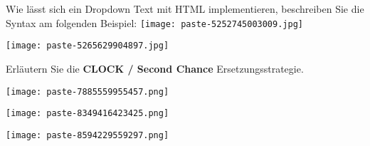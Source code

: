 \documentclass{article}
\begin{document}
\begin{tcolorbox}[colback=white!10!white,colframe=lightgray!75!black,
  savelowerto=\jobname_ex.tex,breakable,enhanced,lines before break=40]

\begin{center}
 Wie lässt sich ein Dropdown Text mit HTML implementieren, beschreiben Sie die Syntax am folgenden Beispiel:
\texttt{[image: paste-5252745003009.jpg]}
 

\end{center}

\tcblower

\justifying
\texttt{[image: paste-5265629904897.jpg]}

\end{tcolorbox}
\begin{tcolorbox}[colback=white!10!white,colframe=lightgray!75!black,
  savelowerto=\jobname_ex.tex,breakable,enhanced,lines before break=40]

\begin{center}
 Erläutern Sie die 
\textbf{CLOCK / Second Chance
}Ersetzungsstrategie. 

\end{center}

\tcblower

\justifying
\texttt{[image: paste-7885559955457.png]}

\end{tcolorbox}
\begin{tcolorbox}[colback=white!10!white,colframe=lightgray!75!black,
  savelowerto=\jobname_ex.tex,breakable,enhanced,lines before break=40]

\begin{center}
 
\texttt{[image: paste-8349416423425.png]}
 

\end{center}

\tcblower

\justifying
\texttt{[image: paste-8594229559297.png]}

\end{tcolorbox}
\end{document}

